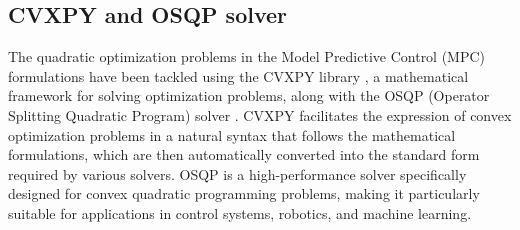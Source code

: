 \documentclass[a4paper,12pt,oneside]{book}
\begin{document}
\subsection*{CVXPY and OSQP solver}
The quadratic optimization problems in the Model Predictive Control (MPC) formulations have been tackled using the CVXPY library \cite{diamond2016cvxpy}, a mathematical framework for solving optimization problems, along with the OSQP  (Operator Splitting Quadratic Program) solver \cite{Stellato_2020}.
CVXPY facilitates the expression of convex optimization problems in a natural syntax that follows the mathematical formulations, which are then automatically converted into the standard form required by various solvers.
OSQP is a high-performance solver specifically designed for convex quadratic programming problems, making it particularly suitable for applications in control systems, robotics, and machine learning.
\end{document}
